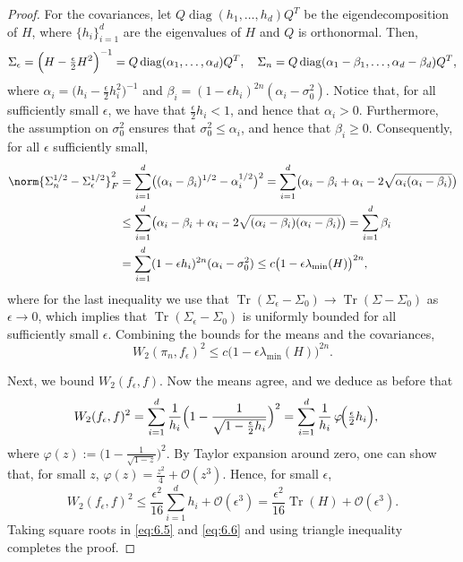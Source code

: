\begin{proof}
For the covariances, let $Q\operatorname{diag}(h_1,\ldots,h_d)Q^T$ be the eigendecomposition
of $H$, where $\{h_i\}_{i=1}^d$ are the eigenvalues of $H$ and $Q$ is orthonormal. Then,
\[
  \Sigma_\epsilon = \Bigl(H - \tfrac{\epsilon}{2}H^2\Bigr)^{-1}
    = Q\operatorname{diag}(\alpha_1,\ldots,\alpha_d)Q^T, \quad
  \Sigma_n = Q\operatorname{diag}(\alpha_1-\beta_1,\ldots,\alpha_d-\beta_d)Q^T,
\]
where $\alpha_i = \bigl(h_i - \frac{\epsilon}{2}h_i^2\bigr)^{-1}$ and
$\beta_i = (1-\epsilon h_i)^{2n}(\alpha_i - \sigma_0^2)$.
Notice that, for all sufficiently small $\epsilon$, we have that $\frac{\epsilon}{2}h_i < 1$,
and hence that $\alpha_i > 0$.
Furthermore, the assumption on $\sigma_0^2$ ensures that $\sigma_0^2 \le \alpha_i$,
and hence that $\beta_i \ge 0$.
Consequently, for all $\epsilon$ sufficiently small,
\begin{align*}
  \norm{\Sigma_n^{1/2} - \Sigma_\epsilon^{1/2}}_F^2
  &= \sum_{i=1}^d \bigl((\alpha_i-\beta_i)^{1/2} - \alpha_i^{1/2}\bigr)^2
   = \sum_{i=1}^d \bigl(\alpha_i - \beta_i + \alpha_i - 2\sqrt{\alpha_i(\alpha_i-\beta_i)}\bigr) \\
  &\le \sum_{i=1}^d \bigl(\alpha_i - \beta_i + \alpha_i - 2\sqrt{(\alpha_i-\beta_i)(\alpha_i-\beta_i)}\bigr)
   = \sum_{i=1}^d \beta_i \\
  &= \sum_{i=1}^d (1-\epsilon h_i)^{2n}(\alpha_i - \sigma_0^2)
   \le c\bigl(1-\epsilon\lambda_{\min}(H)\bigr)^{2n},
\end{align*}
where for the last inequality we use that $\operatorname{Tr}(\Sigma_\epsilon - \Sigma_0) \to
\operatorname{Tr}(\Sigma - \Sigma_0)$ as $\epsilon \to 0$, which implies that
$\operatorname{Tr}(\Sigma_\epsilon - \Sigma_0)$ is uniformly bounded for all sufficiently small
$\epsilon$. Combining the bounds for the means and the covariances,
\begin{equation}
  \label{eq:6.5}
  W_2(\pi_n, f_\epsilon)^2 \le c\bigl(1 - \epsilon\lambda_{\min}(H)\bigr)^{2n}.
\end{equation}

Next, we bound $W_2(f_\epsilon, f)$. Now the means agree, and we deduce as before that
\begin{align*}
  W_2(f_\epsilon, f)^2
  &= \sum_{i=1}^d \frac{1}{h_i}\Bigl(1 - \frac{1}{\sqrt{1-\frac{\epsilon}{2}h_i}}\Bigr)^2
   = \sum_{i=1}^d \frac{1}{h_i}\,\varphi\!\Bigl(\tfrac{\epsilon}{2}h_i\Bigr),
\end{align*}
where $\varphi(z) := \bigl(1 - \frac{1}{\sqrt{1-z}}\bigr)^2$.
By Taylor expansion around zero, one can show that, for small $z$,
$\varphi(z) = \frac{z^2}{4} + \mathcal{O}(z^3)$. Hence, for small $\epsilon$,
\begin{equation}
  \label{eq:6.6}
  W_2(f_\epsilon, f)^2
  \le \frac{\epsilon^2}{16}\sum_{i=1}^d h_i + \mathcal{O}(\epsilon^3)
  = \frac{\epsilon^2}{16}\operatorname{Tr}(H) + \mathcal{O}(\epsilon^3).
\end{equation}
Taking square roots in \eqref{eq:6.5} and \eqref{eq:6.6} and using triangle inequality
completes the proof.
\end{proof}

